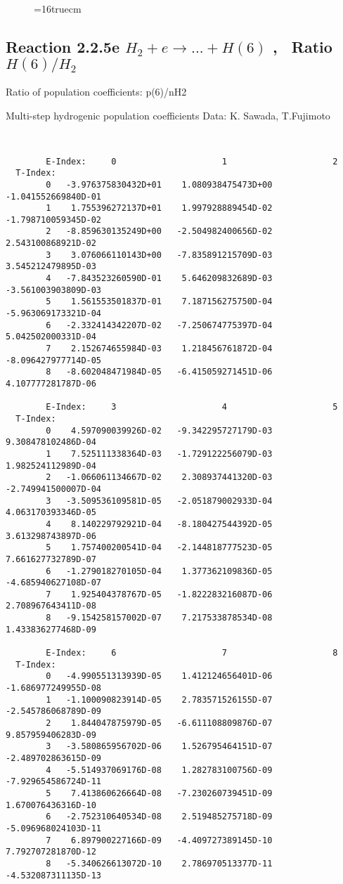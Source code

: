 \documentclass[12pt,dvipdfmx]{article}
\begin{document}
\begin{figure} \label{2.2.5d}
\epsfxsize=16truecm
\end{figure}

\newpage
\subsection{
Reaction 2.2.5e  $H_2 + e \rightarrow ...+ H(6) $  , \  Ratio $H(6)/H_2 $
}

 Ratio of population coefficients: p(6)/nH2

 Multi-step hydrogenic population coefficients
 Data: K. Sawada, T.Fujimoto \cite{kn:Sawada}


\begin{small}\begin{verbatim}


        E-Index:     0                     1                     2
  T-Index:
        0   -3.976375830432D+01    1.080938475473D+00   -1.041552669840D-01
        1    1.755396272137D+01    1.997928889454D-02   -1.798710059345D-02
        2   -8.859630135249D+00   -2.504982400656D-02    2.543100868921D-02
        3    3.076066110143D+00   -7.835891215709D-03    3.545212479895D-03
        4   -7.843523260590D-01    5.646209832689D-03   -3.561003903809D-03
        5    1.561553501837D-01    7.187156275750D-04   -5.963069173321D-04
        6   -2.332414342207D-02   -7.250674775397D-04    5.042502000331D-04
        7    2.152674655984D-03    1.218456761872D-04   -8.096427977714D-05
        8   -8.602048471984D-05   -6.415059271451D-06    4.107777281787D-06

        E-Index:     3                     4                     5
  T-Index:
        0    4.597090039926D-02   -9.342295727179D-03    9.308478102486D-04
        1    7.525111338364D-03   -1.729122256079D-03    1.982524112989D-04
        2   -1.066061134667D-02    2.308937441320D-03   -2.749941500007D-04
        3   -3.509536109581D-05   -2.051879002933D-04    4.063170393346D-05
        4    8.140229792921D-04   -8.180427544392D-05    3.613298743897D-06
        5    1.757400200541D-04   -2.144818777523D-05    7.661627732789D-07
        6   -1.279018270105D-04    1.377362109836D-05   -4.685940627108D-07
        7    1.925404378767D-05   -1.822283216087D-06    2.708967643411D-08
        8   -9.154258157002D-07    7.217533878534D-08    1.433836277468D-09

        E-Index:     6                     7                     8
  T-Index:
        0   -4.990551313939D-05    1.412124656401D-06   -1.686977249955D-08
        1   -1.100090823914D-05    2.783571526155D-07   -2.545786068789D-09
        2    1.844047875979D-05   -6.611108809876D-07    9.857959406283D-09
        3   -3.580865956702D-06    1.526795464151D-07   -2.489702863615D-09
        4   -5.514937069176D-08    1.282783100756D-09   -7.929654586724D-11
        5    7.413860626664D-08   -7.230260739451D-09    1.670076436316D-10
        6   -2.752310640534D-08    2.519485275718D-09   -5.096968024103D-11
        7    6.897900227166D-09   -4.409727389145D-10    7.792707281870D-12
        8   -5.340626613072D-10    2.786970513377D-11   -4.532087311135D-13


\end{verbatim}
\end{small}
\end{document}
